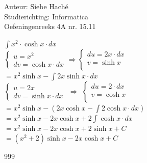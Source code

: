 \documentclass[a4paper]{article}
\begin{document}
\noindent \large Auteur: Siebe Haché \\
\noindent \large Studierichting: Informatica\\
\noindent \large Oefeningenreeks 4A nr. 15.11\\

\medskip
\normalsize

$\displaystyle\int x^2\cdot \cosh x \cdot dx$\\

$\left\{ \begin{array}{l} 
    u = x^2 \\
    dv = \cosh x \cdot dx
\end{array} \right.
\Rightarrow\left\{ \begin{array}{l} 
    du = 2x \cdot dx\\
    v = \sinh x\\
\end{array} \right. $\\

$= x^2 \sinh x - \displaystyle\int 2x \sinh x \cdot dx$\\

$\left\{ \begin{array}{l} 
    u = 2x\\

    dv = \sinh x \cdot dx
\end{array} \right. $
$\Rightarrow$
$\left\{ \begin{array}{l} 
    du = 2 \cdot dx\\
    
    v = \cosh x\\
\end{array} \right. $\\

$= x^2 \sinh x- (2x \cosh x - \displaystyle\int 2 \cosh x \cdot dx)$\\

$= x^2 \sinh x - 2x \cosh x+ 2 \displaystyle\int \cosh x \cdot dx$\\

$= x^2 \sinh x-2x \cosh x + 2 \sinh x + C$\\

$= (x^2 + 2) \sinh x-2x \cosh x + C$\\

\begin{thebibliography}{999}
\end{thebibliography}
\end{document}
